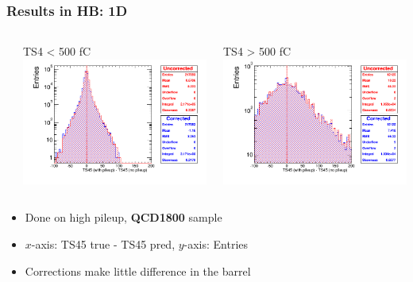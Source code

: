 \documentclass[bigger]{beamer}
\providecommand{\alert}[1]{\textbf{#1}}
\begin{document}
\begin{frame}
\frametitle{Results in HB: 1D}
\label{sec-3-3-4}
\begin{columns} %
\label{sec-3-3-4-1}
\begin{column}{0.55\textwidth}
\label{sec-3-3-4-1-1}

\centering
TS4 < 500 fC
\includegraphics[width=\textwidth]{fig/correction_comparison_1D_sample1800_under500_ring0.png}
\end{column}
\begin{column}{0.55\textwidth}
\label{sec-3-3-4-1-2}

\centering
TS4 > 500 fC
\includegraphics[width=\textwidth]{fig/correction_comparison_1D_sample1800_over500_ring0.png}
\end{column}
\end{columns}
\label{sec-3-3-4-2}
\begin{itemize}

\item Done on high pileup, \alert{QCD1800} sample
\label{sec-3-3-4-2-1}%

\item $x$-axis: TS45 true - TS45 pred, $y$-axis: Entries
\label{sec-3-3-4-2-2}%

\item Corrections make little difference in the barrel
\label{sec-3-3-4-2-3}%
\end{itemize} %
\end{frame}
\end{document}
